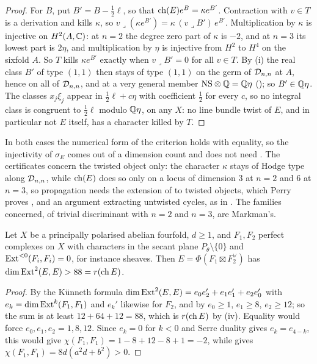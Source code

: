 \begin{proof}
For $B$, put $B'=B-\frac12\ell$, so that $\operatorname{ch}(E)e^{B}=\kappa e^{B'}$.
Contraction with $v\in T$ is a derivation and kills $\kappa$, so
$v\lrcorner(\kappa e^{B'})=\kappa\,(v\lrcorner B')\,e^{B'}$. Multiplication by
$\kappa$ is injective on $H^{2}(A,\mathbb{C})$: at $n=2$ the degree zero part of
$\kappa$ is $-2$, and at $n=3$ its lowest part is $2\eta$, and multiplication
by $\eta$ is injective from $H^{2}$ to $H^{4}$ on the sixfold $A$. So $T$ kills
$\kappa e^{B'}$ exactly when $v\lrcorner B'=0$ for all $v\in T$. By
(i) the real class $B'$ of type $(1,1)$ then stays of
type $(1,1)$ on the germ of $\mathcal{D}_{n,n}$ at $A$, hence on all of $\mathcal{D}_{n,n}$, and
at a very general member $\mathrm{NS}\otimes\mathbb{Q}=\mathbb{Q}\eta$ (\cite[Lemma~7.5]{paperI}); so
$B'\in\mathbb{Q}\eta$. The classes $x_{j}\xi_{j}$ appear in $\frac12\ell+c\eta$ with
coefficient $\frac12$ for every $c$, so no integral class is congruent to
$\frac12\ell$ modulo $\mathbb{Q}\eta$, on any $X$: no line bundle twist of $E$, and in
particular not $E$ itself, has a character killed by $T$.
\end{proof}

In both cases the numerical form of the criterion holds with equality, so the
injectivity of $\sigma_{E}$ comes out of a dimension count and does not need
\cite[Question 11.4]{Mar25b}. The certificates concern the twisted object
only: the character $\kappa$ stays of Hodge type along $\mathcal{D}_{n,n}$, while
$\operatorname{ch}(E)$ does
so only on a locus of dimension $3$ at $n=2$ and $6$ at $n=3$, so propagation
needs the extension of  to twisted objects, which Perry proves
\cite{Per26}, and an argument extracting untwisted cycles, as in
\cite[Section 2]{Mar25b}. The families concerned, of trivial discriminant with
$n=2$ and $n=3$, are Markman's.

\begin{proposition}[No Orlov product at $n=4$]\label{prop:orlovfour}
Let $X$ be a principally polarised abelian fourfold, $d\ge1$, and
$F_{1},F_{2}$ perfect complexes on $X$ with characters in the secant plane
$P_{\theta}\setminus\{0\}$ and $\operatorname{Ext}^{<0}(F_{i},F_{i})=0$, for instance
sheaves. Then $E=\Phi(F_{1}\boxtimes F_{2}^{\vee})$ has
$\dim\operatorname{Ext}^{2}(E,E)>88=r(\operatorname{ch} E)$.
\end{proposition}

\begin{proof}
By the K\"unneth formula $\dim\operatorname{Ext}^{2}(E,E)=e_{0}e_{2}'+e_{1}e_{1}'+e_{2}e_{0}'$
with $e_{k}=\dim\operatorname{Ext}^{k}(F_{1},F_{1})$ and $e_{k}'$ likewise for $F_{2}$, and by
 $e_{0}\ge1$, $e_{1}\ge8$, $e_{2}\ge12$; so the sum is
at least $12+64+12=88$, which is $r(\operatorname{ch} E)$ by (iv). Equality
would force $e_{0},e_{1},e_{2}=1,8,12$. Since $e_{k}=0$ for $k<0$ and Serre
duality gives $e_{k}=e_{4-k}$, this would give
$\chi(F_{1},F_{1})=1-8+12-8+1=-2$, while  gives
$\chi(F_{1},F_{1})=8d(a^{2}d+b^{2})>0$.
\end{proof}

